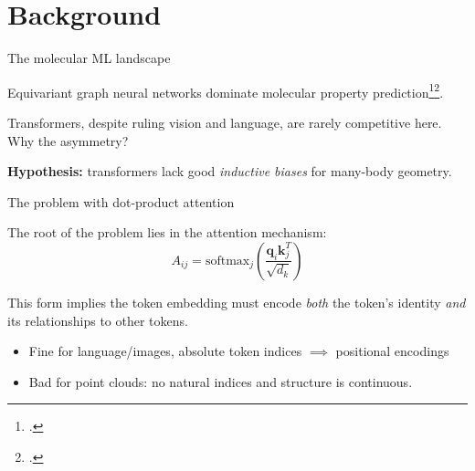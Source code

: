\documentclass{beamer}
\begin{document}
\section{Background}

\begin{frame}{The molecular ML landscape}

Equivariant graph neural networks dominate molecular property prediction\footcite{li-mlip-review}\footcite{jacobs-mlip-review}.

\vspace{1em}

Transformers, despite ruling vision and language, are rarely competitive here. Why the asymmetry?

\vspace{1em}

\textbf{Hypothesis:} transformers lack good \textit{inductive biases} for many-body geometry.

\end{frame}

\begin{frame}{The problem with dot-product attention}

The root of the problem lies in the attention mechanism:
\[
A_{ij}=\mathrm{softmax}_j\left( \frac{\mathbf{q}_i \mathbf{k}_j^T}{\sqrt{d_k}} \right)
\]

This form implies the token embedding must encode \textit{both} the token's identity \textit{and} its relationships to other tokens. 
\vspace{1em}

\begin{itemize}
    \item[$\rightarrow$] Fine for language/images, absolute token indices $\implies$ positional encodings
    \item[$\rightarrow$] Bad for point clouds: no natural indices and structure is continuous.
\end{itemize}

\end{frame}
\end{document}
